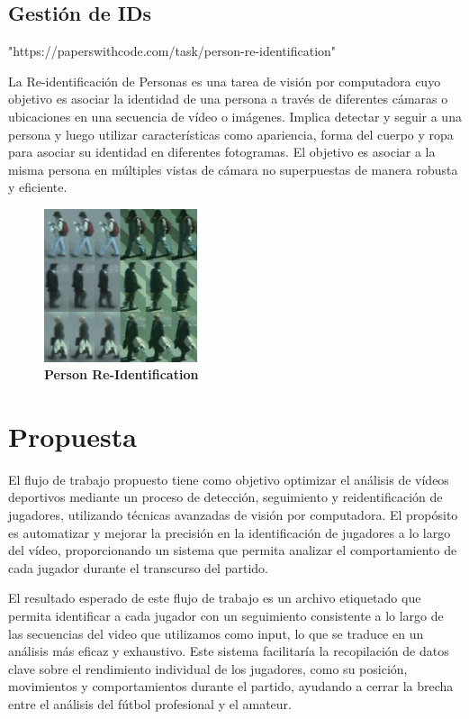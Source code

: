 \documentclass[12pt, a4paper, twoside]{article}
\begin{document}
	\subsection{Gestión de IDs}
	
	"https://paperswithcode.com/task/person-re-identification"
	
	La Re-identificación de Personas es una tarea de visión por computadora cuyo objetivo es asociar la identidad de una persona a través de diferentes cámaras o ubicaciones en una secuencia de vídeo o imágenes. Implica detectar y seguir a una persona y luego utilizar características como apariencia, forma del cuerpo y ropa para asociar su identidad en diferentes fotogramas. El objetivo es asociar a la misma persona en múltiples vistas de cámara no superpuestas de manera robusta y eficiente. 
	
	\begin{figure}[H]
		\centering
		\includegraphics[width=0.4\textwidth]{image/gestion_id}
		\caption{\textbf{Person Re-Identification}}
		\label{gestion_id}
	\end{figure}
	
	
	\section{Propuesta}
	
	El flujo de trabajo propuesto tiene como objetivo optimizar el análisis de vídeos deportivos mediante un proceso de detección, seguimiento y reidentificación de jugadores, utilizando técnicas avanzadas de visión por computadora. El propósito es automatizar y mejorar la precisión en la identificación de jugadores a lo largo del vídeo, proporcionando un sistema que permita analizar el comportamiento de cada jugador durante el transcurso del partido.
	
	El resultado esperado de este flujo de trabajo es un archivo etiquetado que permita identificar a cada jugador con un seguimiento consistente a lo largo de las secuencias del video que utilizamos como input, lo que se traduce en un análisis más eficaz y exhaustivo. Este sistema facilitaría la recopilación de datos clave sobre el rendimiento individual de los jugadores, como su posición, movimientos y comportamientos durante el partido, ayudando a cerrar la brecha entre el análisis del fútbol profesional y el amateur.
	
\end{document}
